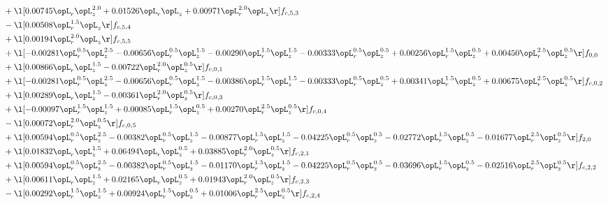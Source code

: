\begin{alignat}{2}
& + \l[  0.00745 \opL_r \opL_z^{2.0} +  0.01526 \opL_r \opL_z +  0.00971 \opL_r^{2.0} \opL_z  \r] f_{c,5,3} \nonumber \\ 
& - \l[  0.00508 \opL_r^{1.5} \opL_z  \r] f_{c,5,4} \nonumber \\ 
& + \l[  0.00194 \opL_r^{2.0} \opL_z  \r] f_{c,5,5} \nonumber \\ 
& + \l[  -0.00281 \opL_r^{0.5} \opL_z^{2.5}   -0.00656 \opL_r^{0.5} \opL_z^{1.5}   -0.00290 \opL_r^{1.5} \opL_z^{1.5}   -0.00333 \opL_r^{0.5} \opL_z^{0.5} +  0.00256 \opL_r^{1.5} \opL_z^{0.5} +  0.00450 \opL_r^{2.5} \opL_z^{0.5}  \r] f_{0,0} \nonumber \\ 
& + \l[  0.00866 \opL_r \opL_z^{1.5}   -0.00722 \opL_r^{2.0} \opL_z^{0.5}  \r] f_{c,0,1} \nonumber \\ 
& + \l[  -0.00281 \opL_r^{0.5} \opL_z^{2.5}   -0.00656 \opL_r^{0.5} \opL_z^{1.5}   -0.00386 \opL_r^{1.5} \opL_z^{1.5}   -0.00333 \opL_r^{0.5} \opL_z^{0.5} +  0.00341 \opL_r^{1.5} \opL_z^{0.5} +  0.00675 \opL_r^{2.5} \opL_z^{0.5}  \r] f_{c,0,2} \nonumber \\ 
& + \l[  0.00289 \opL_r \opL_z^{1.5}   -0.00361 \opL_r^{2.0} \opL_z^{0.5}  \r] f_{c,0,3} \nonumber \\ 
& + \l[  -0.00097 \opL_r^{1.5} \opL_z^{1.5} +  0.00085 \opL_r^{1.5} \opL_z^{0.5} +  0.00270 \opL_r^{2.5} \opL_z^{0.5}  \r] f_{c,0,4} \nonumber \\ 
& - \l[  0.00072 \opL_r^{2.0} \opL_z^{0.5}  \r] f_{c,0,5} \nonumber \\ 
& + \l[  0.00594 \opL_r^{0.5} \opL_z^{2.5}   -0.00382 \opL_r^{0.5} \opL_z^{1.5}   -0.00877 \opL_r^{1.5} \opL_z^{1.5}   -0.04225 \opL_r^{0.5} \opL_z^{0.5}   -0.02772 \opL_r^{1.5} \opL_z^{0.5}   -0.01677 \opL_r^{2.5} \opL_z^{0.5}  \r] f_{2,0} \nonumber \\ 
& + \l[  0.01832 \opL_r \opL_z^{1.5} +  0.06494 \opL_r \opL_z^{0.5} +  0.03885 \opL_r^{2.0} \opL_z^{0.5}  \r] f_{c,2,1} \nonumber \\ 
& + \l[  0.00594 \opL_r^{0.5} \opL_z^{2.5}   -0.00382 \opL_r^{0.5} \opL_z^{1.5}   -0.01170 \opL_r^{1.5} \opL_z^{1.5}   -0.04225 \opL_r^{0.5} \opL_z^{0.5}   -0.03696 \opL_r^{1.5} \opL_z^{0.5}   -0.02516 \opL_r^{2.5} \opL_z^{0.5}  \r] f_{c,2,2} \nonumber \\ 
& + \l[  0.00611 \opL_r \opL_z^{1.5} +  0.02165 \opL_r \opL_z^{0.5} +  0.01943 \opL_r^{2.0} \opL_z^{0.5}  \r] f_{c,2,3} \nonumber \\ 
& - \l[  0.00292 \opL_r^{1.5} \opL_z^{1.5} +  0.00924 \opL_r^{1.5} \opL_z^{0.5} +  0.01006 \opL_r^{2.5} \opL_z^{0.5}  \r] f_{c,2,4} \nonumber \\ 

\end{alignat}
